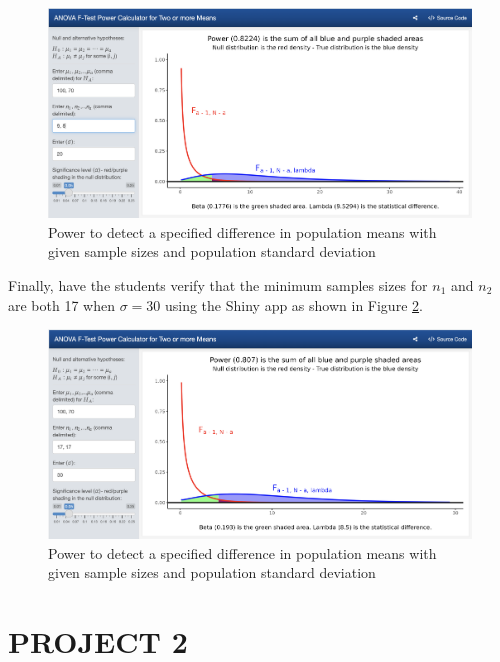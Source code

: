 \documentclass[
]{article}
\begin{document}
\begin{figure}

{\centering \includegraphics[width=7.34in]{./pics/fig-power2b} 

}

\caption{Power to detect a specified difference in population means with given sample sizes and population standard deviation}\label{fig:power2}
\end{figure}

Finally, have the students verify that the minimum samples sizes for \(n_1\) and \(n_2\) are both 17 when \(\sigma = 30\) using the Shiny app as shown in Figure \ref{fig:power3}.

\begin{figure}

{\centering \includegraphics[width=7.35in]{./pics/fig-power3b} 

}

\caption{Power to detect a specified difference in population means with given sample sizes and population standard deviation}\label{fig:power3}
\end{figure}

\hypertarget{project-2}{%
\section*{PROJECT 2}\label{project-2}}
\end{document}
